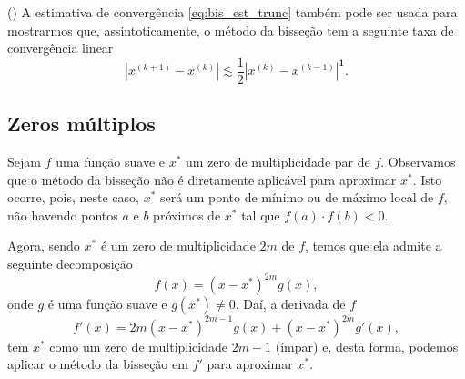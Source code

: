 \begin{obs}()
  A estimativa de convergência \eqref{eq:bis_est_trunc} também pode ser usada para mostrarmos que, assintoticamente, o método da bisseção tem a seguinte taxa de convergência linear
  \begin{equation}
    \left|x^{(k+1)} - x^{(k)}\right| \lesssim \frac{1}{2}\left|x^{(k)} - x^{(k-1)}\right|^{\pmb{1}}.
  \end{equation}
\end{obs}

\subsection{Zeros múltiplos}

Sejam $f$ uma função suave e $x^*$ um zero de multiplicidade par de $f$. Observamos que o método da bisseção não é diretamente aplicável para aproximar $x^*$. Isto ocorre, pois, neste caso, $x^*$ será um ponto de mínimo ou de máximo local de $f$, não havendo pontos $a$ e $b$ próximos de $x^*$ tal que $f(a)\cdot f(b) < 0$.

Agora, sendo $x^*$ é um zero de multiplicidade $2m$ de $f$, temos que ela admite a seguinte decomposição
\begin{equation}
  f(x) = (x-x^*)^{2m}g(x),
\end{equation}
onde $g$ é uma função suave e $g(x^*)\neq 0$. Daí, a derivada de $f$
\begin{equation}
  f'(x) = 2m(x-x^*)^{2m-1}g(x) + (x-x^*)^{2m}g'(x),
\end{equation}
tem $x^*$ como um zero de multiplicidade $2m-1$ (ímpar) e, desta forma, podemos aplicar o método da bisseção em $f'$ para aproximar $x^*$.

